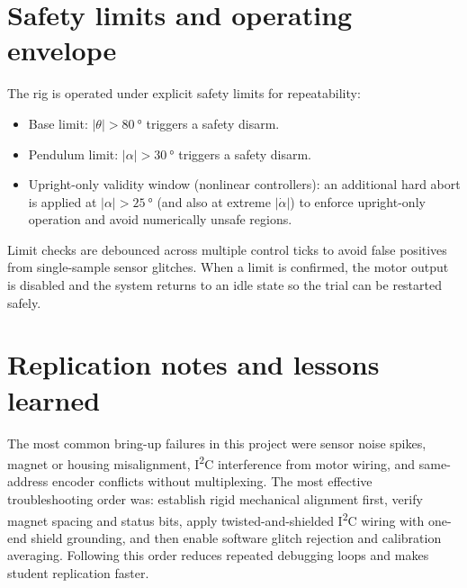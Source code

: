 \section{Safety limits and operating envelope}
The rig is operated under explicit safety limits for repeatability:
\begin{itemize}
  \item Base limit: $|\theta| > \SI{80}{\degree}$ triggers a safety disarm.
  \item Pendulum limit: $|\alpha| > \SI{30}{\degree}$ triggers a safety disarm.
  \item Upright-only validity window (nonlinear controllers): an additional hard abort is applied at $|\alpha|>\SI{25}{\degree}$ (and also at extreme $|\dot{\alpha}|$) to enforce upright-only operation and avoid numerically unsafe regions.
\end{itemize}

Limit checks are debounced across multiple control ticks to avoid false positives from single-sample sensor glitches. When a limit is confirmed, the motor output is disabled and the system returns to an idle state so the trial can be restarted safely.

\section{Replication notes and lessons learned}
\label{sec:replication_notes}
The most common bring-up failures in this project were sensor noise spikes, magnet or housing misalignment, I\textsuperscript{2}C interference from motor wiring, and same-address encoder conflicts without multiplexing. The most effective troubleshooting order was: establish rigid mechanical alignment first, verify magnet spacing and status bits, apply twisted-and-shielded I\textsuperscript{2}C wiring with one-end shield grounding, and then enable software glitch rejection and calibration averaging. Following this order reduces repeated debugging loops and makes student replication faster.
